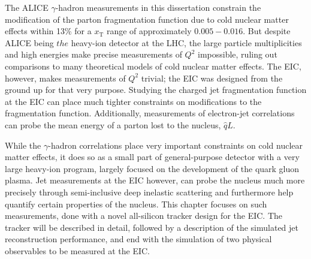 The ALICE $\gamma$-hadron measurements in this dissertation constrain the modification of the parton fragmentation function due to cold nuclear matter effects within 13\% for a  $x_\mathrm{T}$ range of approximately $0.005-0.016$. But despite ALICE being  $the$ heavy-ion detector at the LHC, the large particle multiplicities and high energies make precise measurements of  $Q^2$ impossible, ruling out comparisons to many theoretical models of cold nuclear matter effects. The EIC, however, makes measurements of $Q^2$ trivial; the EIC was designed from the ground up for that very purpose. Studying the charged jet fragmentation function at the EIC can place much tighter constraints on modifications to the fragmentation function. Additionally, measurements of electron-jet correlations can probe the mean energy of a parton lost to the nucleus, $\hat{q}L$. 

While the $\gamma$-hadron correlations place very important constraints on cold nuclear matter effects, it does so as a small part of general-purpose detector with a very large heavy-ion program, largely focused on the development of the quark gluon plasma. Jet measurements at the EIC however, can probe the nucleus much more precisely through semi-inclusive deep inelastic scattering and furthermore help quantify certain properties of the nucleus. This chapter focuses on such measurements, done with a novel all-silicon tracker design for the EIC. The tracker will be described in detail, followed by a description of the simulated jet reconstruction performance, and end with the simulation of two physical observables to be measured at the EIC.

